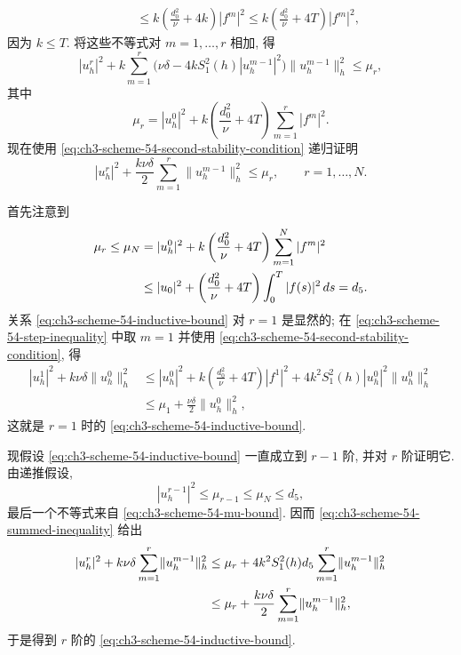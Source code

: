 {\begin{Proof}
\begin{align}
&\qquad\leq k\left(\frac{d_0^2}{\nu}+4k\right)|f^m|^2
\leq k\left(\frac{d_0^2}{\nu}+4T\right)|f^m|^2,
\label{eq:ch3-scheme-54-step-inequality}
\end{align}
因为 $k\leq T$. 将这些不等式对 $m=1,\ldots,r$ 相加, 得
\begin{equation}
|u_h^r|^2+k\sum_{m=1}^r
\bigl(\nu\delta-4kS_1^2(h)|u_h^{m-1}|^2\bigr)
\lVert u_h^{m-1}\rVert_h^2\leq\mu_r,
\label{eq:ch3-scheme-54-summed-inequality}
\end{equation}
其中
\begin{equation}
\mu_r=|u_h^0|^2+k\left(\frac{d_0^2}{\nu}+4T\right)
\sum_{m=1}^r|f^m|^2.
\label{eq:ch3-scheme-54-mu-r}
\end{equation}
现在使用 \eqref{eq:ch3-scheme-54-second-stability-condition} 递归证明
\begin{equation}
|u_h^r|^2+\frac{k\nu\delta}{2}
\sum_{m=1}^r\lVert u_h^{m-1}\rVert_h^2\leq\mu_r,
\qquad r=1,\ldots,N.
\label{eq:ch3-scheme-54-inductive-bound}
\end{equation}

\hypertarget{chapter-03-page-250}{}
首先注意到
\begin{align}
\mu_r\leq\mu_N
&=|u_h^0|^2+k\left(\frac{d_0^2}{\nu}+4T\right)
\sum_{m=1}^N|f^m|^2\notag\\
&\leq|u_0|^2+\left(\frac{d_0^2}{\nu}+4T\right)
\int_0^T|f(s)|^2\,ds=d_5.
\label{eq:ch3-scheme-54-mu-bound}
\end{align}
关系 \eqref{eq:ch3-scheme-54-inductive-bound} 对 $r=1$ 是显然的; 在 \eqref{eq:ch3-scheme-54-step-inequality} 中取 $m=1$ 并使用 \eqref{eq:ch3-scheme-54-second-stability-condition}, 得
\begin{align*}
|u_h^1|^2+k\nu\delta\lVert u_h^0\rVert_h^2
&\leq|u_h^0|^2+k\left(\frac{d_0^2}{\nu}+4T\right)|f^1|^2
+4k^2S_1^2(h)|u_h^0|^2\lVert u_h^0\rVert_h^2\\
&\leq\mu_1+\frac{\nu\delta}{2}\lVert u_h^0\rVert_h^2,
\end{align*}
这就是 $r=1$ 时的 \eqref{eq:ch3-scheme-54-inductive-bound}.

现假设 \eqref{eq:ch3-scheme-54-inductive-bound} 一直成立到 $r-1$ 阶, 并对 $r$ 阶证明它. 由递推假设,
\begin{equation}
|u_h^{r-1}|^2\leq\mu_{r-1}\leq\mu_N\leq d_5,
\label{eq:ch3-scheme-54-recurrence-uniform-bound}
\end{equation}
最后一个不等式来自 \eqref{eq:ch3-scheme-54-mu-bound}. 因而 \eqref{eq:ch3-scheme-54-summed-inequality} 给出
\begin{align}
|u_h^r|^2+k\nu\delta\sum_{m=1}^r\lVert u_h^{m-1}\rVert_h^2
&\leq\mu_r+4k^2S_1^2(h)d_5
\sum_{m=1}^r\lVert u_h^{m-1}\rVert_h^2\notag\\
&\leq\mu_r+\frac{k\nu\delta}{2}
\sum_{m=1}^r\lVert u_h^{m-1}\rVert_h^2,
\label{eq:ch3-scheme-54-induction-step}
\end{align}
于是得到 $r$ 阶的 \eqref{eq:ch3-scheme-54-inductive-bound}.


\end{Proof}}
